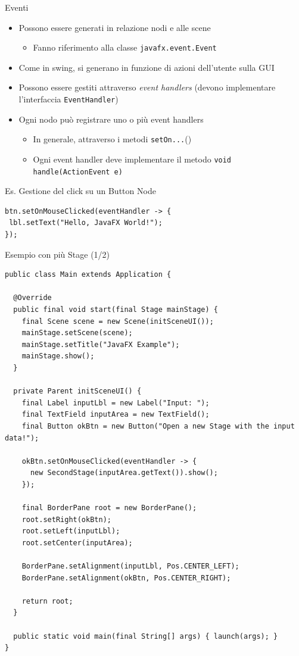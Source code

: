 \documentclass[presentation]{beamer}
\begin{document}
\begin{frame}[fragile]{Eventi}
\begin{itemize}\itemsep10pt
\item Possono essere generati in relazione nodi e alle scene
\begin{itemize}
\item Fanno riferimento alla classe \texttt{javafx.event.Event}
\end{itemize}
\item Come in swing, si generano in funzione di azioni dell'utente sulla GUI
\item Possono essere gestiti attraverso \emph{event handlers} (devono implementare l'interfaccia \texttt{EventHandler})
\item Ogni nodo può registrare uno o più event handlers
\begin{itemize}
\item In generale, attraverso i metodi \texttt{setOn...}()
\item Ogni event handler deve implementare il metodo \texttt{void handle(ActionEvent e)}
\end{itemize}
\end{itemize}

\begin{block}{Es. Gestione del click su un Button Node}
\begin{lstlisting}
btn.setOnMouseClicked(eventHandler -> {
 lbl.setText("Hello, JavaFX World!");
});
\end{lstlisting}
\end{block}
\end{frame}

\begin{frame}[fragile]{Esempio con più Stage (1/2)}
\begin{lstlisting}[basicstyle=\tiny]
public class Main extends Application {

  @Override
  public final void start(final Stage mainStage) {
    final Scene scene = new Scene(initSceneUI());
    mainStage.setScene(scene);
    mainStage.setTitle("JavaFX Example");
    mainStage.show();
  }

  private Parent initSceneUI() {
    final Label inputLbl = new Label("Input: ");
    final TextField inputArea = new TextField();
    final Button okBtn = new Button("Open a new Stage with the input data!");

    okBtn.setOnMouseClicked(eventHandler -> {
      new SecondStage(inputArea.getText()).show();
    });

    final BorderPane root = new BorderPane();
    root.setRight(okBtn);
    root.setLeft(inputLbl);
    root.setCenter(inputArea);

    BorderPane.setAlignment(inputLbl, Pos.CENTER_LEFT);
    BorderPane.setAlignment(okBtn, Pos.CENTER_RIGHT);

    return root;
  }

  public static void main(final String[] args) { launch(args); }
}
\end{lstlisting}
\end{frame}
\end{document}
